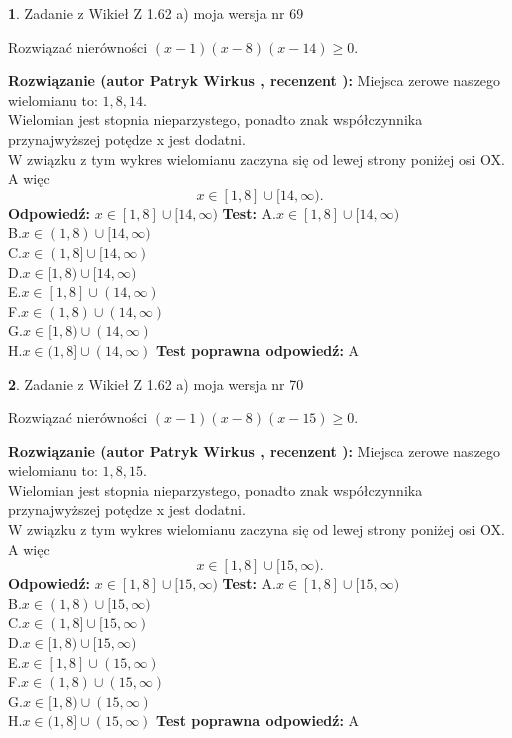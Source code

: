 \documentclass[12pt, a4paper]{article}
\theoremstyle{definition} %
\newtheorem{zad}{}
\newcommand{\zadStart}[1]{\begin{zad}#1\newline}
\newcommand{\zadStop}{\end{zad}}
\newcommand{\rozwStart}[2]{\noindent \textbf{Rozwiązanie (autor #1 , recenzent #2): }\newline}
\newcommand{\rozwStop}{\newline}
\newcommand{\odpStart}{\noindent \textbf{Odpowiedź:}\newline}
\newcommand{\odpStop}{\newline}
\newcommand{\testStart}{\noindent \textbf{Test:}\newline}
\newcommand{\testStop}{\newline}
\newcommand{\kluczStart}{\noindent \textbf{Test poprawna odpowiedź:}\newline}
\newcommand{\kluczStop}{\newline}
\begin{document}
\zadStart{Zadanie z Wikieł Z 1.62 a) moja wersja nr 69}

Rozwiązać nierówności $(x-1)(x-8)(x-14)\ge0$.
\zadStop
\rozwStart{Patryk Wirkus}{}
Miejsca zerowe naszego wielomianu to: $1, 8, 14$.\\
Wielomian jest stopnia nieparzystego, ponadto znak współczynnika przy\linebreak najwyższej potędze x jest dodatni.\\ W związku z tym wykres wielomianu zaczyna się od lewej strony poniżej osi OX. A więc $$x \in [1,8] \cup [14,\infty).$$
\rozwStop
\odpStart
$x \in [1,8] \cup [14,\infty)$
\odpStop
\testStart
A.$x \in [1,8] \cup [14,\infty)$\\
B.$x \in (1,8) \cup [14,\infty)$\\
C.$x \in (1,8] \cup [14,\infty)$\\
D.$x \in [1,8) \cup [14,\infty)$\\
E.$x \in [1,8] \cup (14,\infty)$\\
F.$x \in (1,8) \cup (14,\infty)$\\
G.$x \in [1,8) \cup (14,\infty)$\\
H.$x \in (1,8] \cup (14,\infty)$
\testStop
\kluczStart
A
\kluczStop



\zadStart{Zadanie z Wikieł Z 1.62 a) moja wersja nr 70}

Rozwiązać nierówności $(x-1)(x-8)(x-15)\ge0$.
\zadStop
\rozwStart{Patryk Wirkus}{}
Miejsca zerowe naszego wielomianu to: $1, 8, 15$.\\
Wielomian jest stopnia nieparzystego, ponadto znak współczynnika przy\linebreak najwyższej potędze x jest dodatni.\\ W związku z tym wykres wielomianu zaczyna się od lewej strony poniżej osi OX. A więc $$x \in [1,8] \cup [15,\infty).$$
\rozwStop
\odpStart
$x \in [1,8] \cup [15,\infty)$
\odpStop
\testStart
A.$x \in [1,8] \cup [15,\infty)$\\
B.$x \in (1,8) \cup [15,\infty)$\\
C.$x \in (1,8] \cup [15,\infty)$\\
D.$x \in [1,8) \cup [15,\infty)$\\
E.$x \in [1,8] \cup (15,\infty)$\\
F.$x \in (1,8) \cup (15,\infty)$\\
G.$x \in [1,8) \cup (15,\infty)$\\
H.$x \in (1,8] \cup (15,\infty)$
\testStop
\kluczStart
A
\kluczStop
\end{document}
